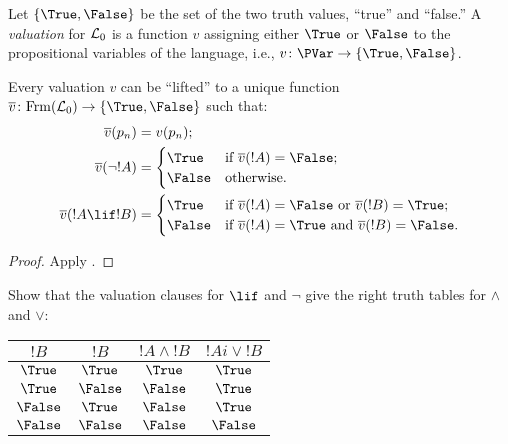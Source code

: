 \documentclass[../../include/open-logic-section]{subfiles}
\begin{document}


\begin{defn}[Valuations] 
Let $\{\True, \False\}$ be the set of the two truth
values, ``true'' and ``false.'' A \emph{valuation} for $\mathcal L_0$ is a
function $v$ assigning either $\True$ or $\False$ to the propositional
variables of the language, i.e., $v \colon \PVar \to \{\True, \False \}$.
\end{defn}

\begin{thm} Every valuation $v$ can be ``lifted'' to a unique function
$\overline{v} \colon \Frm[L_0] \to \{\True, \False \}$ such that: 
\begin{align*}
\overline{v}(p_n) & = v(p_n); \\ 
\overline{v}(\lnot !A) & = \begin{cases}
   \True & \text{if } \overline{v}(!A) = \False;\\ 
   \False & \text{otherwise.} 
\end{cases} \\ 
\overline{v}(!A \lif !B) & = \begin{cases} 
  \True & \text{if $\overline{v}(!A) = \False$ or $\overline{v}(!B) = \True$;}\\
  \False & \text{if $\overline{v}(!A) = \True$ and 
    $\overline{v}(!B) = \False$}. 
\end{cases}
\end{align*}
\end{thm}

\begin{proof} 
Apply . 
\end{proof}

\begin{prob} 
Show that the valuation clauses for $\lif$ and $\lnot$ give
the right truth tables for $\land$ and $\lor$: 
\begin{center}
\begin{tabular}{|cc||c|c|} \hline 
$!B$ & $!B$ & $!A \land !B$ & $!Ai \lor !B$ \\ 
\hline \hline 
$\True$ & $\True$ & $\True$ & $\True$ \\ 
$\True$ & $\False$ & $\False$ & $\True$ \\ 
$\False$ & $\True$ & $\False$ & $\True$ \\
$\False$ & $\False$ & $\False$ & $\False$ \\ 
\hline 
\end{tabular}
\end{center} 
\end{prob}
\end{document}
